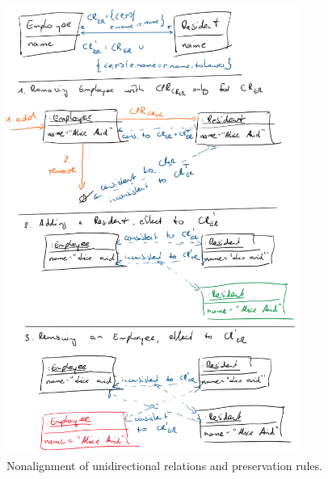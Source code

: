 \begin{figure}
    \centering
    \includegraphics[width=0.85\textwidth]{figures/correctness/synchronization/unidirectional_nonalignment.png}
    \caption[Nonalignment of unidirectional relations and preservation]{Nonalignment of unidirectional relations and preservation rules. %
    }
    \label{fig:synchronization:unidirectional_nonalignment}
\end{figure}

